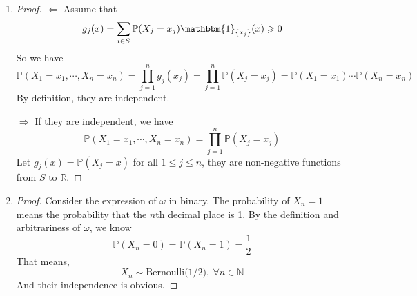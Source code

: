 \documentclass{article}
\begin{document}
\begin{enumerate}
        \item \begin{proof}
            $\Leftarrow$ Assume that
            $$g_j(x)=\sum_{i\in S}\mathbb{P}(X_j=x_j)\mathbbm{1}_{\{x_j\}}(x)\geqslant 0$$
            So we have
            $$\mathbb{P}(X_1=x_1,\cdots,X_n=x_n)=\prod_{j=1}^n g_j(x_j)=\prod_{j=1}^n\mathbb{P}(X_j=x_j)=\mathbb{P}(X_1=x_1)\cdots\mathbb{P}(X_n=x_n)$$
            By definition, they are independent.

            $\Rightarrow$ If they are independent, we have
            $$\mathbb{P}\left(X_1=x_1, \cdots, X_n=x_n\right)
            =\prod_{j=1}^n \mathbb{P}\left(X_j=x_j\right)$$
            Let $g_j(x) = \mathbb{P}\left(X_j=x\right)$ for all $1\leqslant j \leqslant n$, they are non-negative functions from $S$ to $\mathbb{R}$.
        \end{proof}

        \item \begin{proof}
            Consider the expression of $\omega$ in binary. The probability of $X_n=1$
            means the probability that the $n$th decimal place is 1.
            By the definition and arbitrariness of $\omega$, we know
            $$\mathbb{P}\left(X_n=0\right)=\mathbb{P}\left(X_n=1\right)=\frac{1}{2}$$
            That means, $$X_n \sim \text{Bernoulli(1/2)}, \ \forall n\in \mathbb{N}$$
            And their independence is obvious.
        \end{proof}
    
    \end{enumerate}
\end{document}
